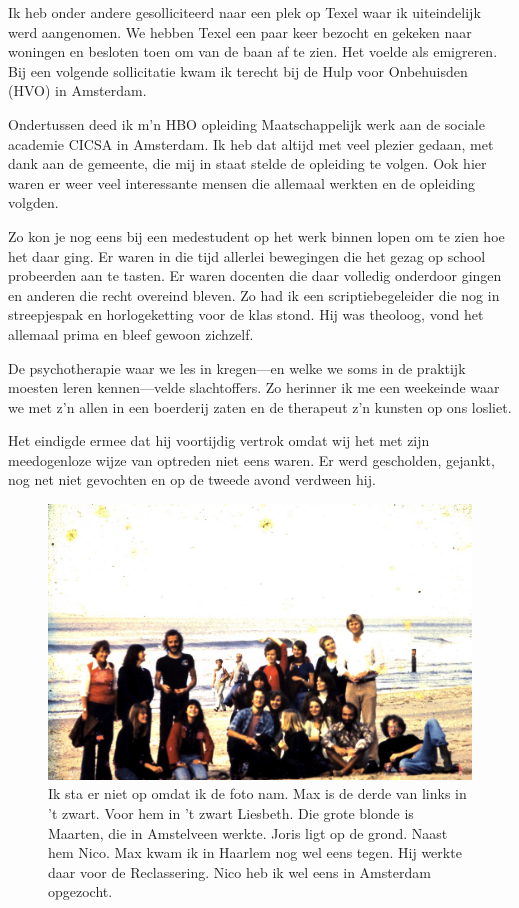 \documentclass[12pt,twoside, openright]{memoir}
\begin{document}
Ik heb onder andere gesolliciteerd naar een plek op Texel waar ik uiteindelijk werd aangenomen. We hebben Texel een paar keer bezocht en gekeken naar woningen en besloten toen om van de baan af te zien. Het voelde als emigreren. Bij een volgende sollicitatie kwam ik terecht bij de Hulp voor Onbehuisden (HVO) in Amsterdam.

Ondertussen deed ik m’n HBO opleiding Maatschappelijk werk aan de sociale academie CICSA in Amsterdam. Ik heb dat altijd met veel plezier gedaan, met dank aan de gemeente, die mij in staat stelde de opleiding te volgen. Ook hier waren er weer veel interessante mensen die allemaal werkten en de opleiding volgden. 

Zo kon je nog eens bij een medestudent op het werk binnen lopen om te zien hoe het daar ging. Er waren in die tijd allerlei bewegingen die het gezag op school probeerden aan te tasten. Er waren docenten die daar volledig onderdoor gingen en anderen die recht overeind bleven. Zo had ik een scriptiebegeleider die nog in streepjespak en horlogeketting voor de klas stond. Hij was theoloog, vond het allemaal prima en bleef gewoon zichzelf. 

De psychotherapie waar we les in kregen---en welke we soms in de praktijk moesten leren kennen---velde slachtoffers. Zo herinner ik me een weekeinde waar we met z’n allen in een boerderij zaten en de therapeut z’n kunsten op ons losliet. 

Het eindigde ermee dat hij voortijdig vertrok omdat wij het met zijn meedogenloze wijze van optreden niet eens waren. Er werd gescholden, gejankt, nog net niet gevochten en op de tweede avond verdween hij.

\begin{figure}
\centering
\includegraphics[width=\textwidth]{img/ch42/4-9-2009_002}
\caption*{\footnotesize Ik sta er niet op omdat ik de foto nam. Max is de derde van links in ’t zwart. Voor hem in ’t zwart Liesbeth. Die grote blonde is Maarten, die in Amstelveen werkte. Joris ligt op de grond. Naast hem Nico. Max kwam ik in Haarlem nog wel eens tegen. Hij werkte daar voor de Reclassering. Nico heb ik wel eens in Amsterdam opgezocht.}
\end{figure}
\end{document}

